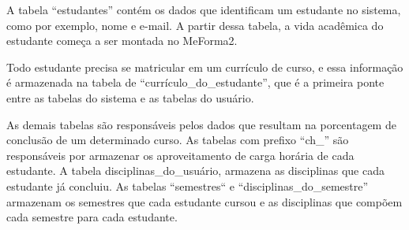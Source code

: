 A tabela ``estudantes'' contém os dados que identificam um estudante no sistema, como por exemplo, nome e e-mail. A partir dessa tabela, a vida acadêmica do estudante começa a ser montada no MeForma2.

Todo estudante precisa se matricular em um currículo de curso, e essa informação é armazenada na tabela de ``currículo\_do\_estudante'', que é a primeira ponte entre as tabelas do sistema e as tabelas do usuário.

As demais tabelas são responsáveis pelos dados que resultam na porcentagem de conclusão de um determinado curso. As tabelas com prefixo ``ch\_'' são responsáveis por armazenar os aproveitamento de carga horária de cada estudante. A tabela disciplinas\_do\_usuário, armazena as disciplinas que cada estudante já concluiu. As tabelas ``semestres`` e ``disciplinas\_do\_semestre'' armazenam os semestres que cada estudante cursou e as disciplinas que compõem cada semestre para cada estudante.